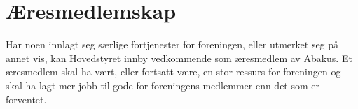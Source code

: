 \section{Æresmedlemskap}
Har noen innlagt seg særlige fortjenester for foreningen, eller utmerket seg på annet vis, 
kan Hovedstyret innby vedkommende som æresmedlem av Abakus. Et æresmedlem skal ha vært, eller fortsatt være, 
en stor ressurs for foreningen og skal ha lagt mer jobb til gode for foreningens medlemmer enn det som er forventet.
